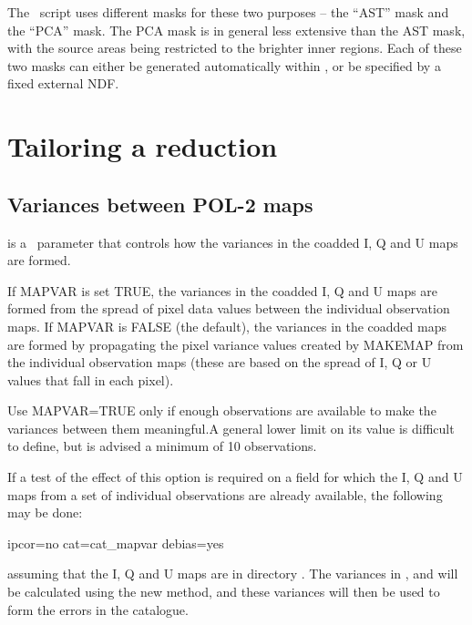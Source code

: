 The \poltwomap\ script uses different masks for these two purposes -- the
``AST'' mask and the ``PCA'' mask.  The PCA mask is in general less
extensive than the AST mask, with the source areas being restricted to
the brighter inner regions.  Each of these two masks can either be
generated automatically within , or be specified by a fixed
external NDF.



\section{Tailoring a reduction}

\subsection*{Variances between POL-2 maps}

 is a \poltwomap\ parameter that controls how the variances in the
coadded I, Q and U maps are formed.

If MAPVAR is set TRUE, the variances in the coadded I, Q and U maps
are formed from the spread of pixel data values between the individual
observation maps. If MAPVAR is FALSE (the default), the variances in
the coadded maps are formed by propagating the pixel variance values
created by MAKEMAP from the individual observation maps (these are
based on the spread of I, Q or U values that fall in each pixel).

Use MAPVAR=TRUE only if enough observations are available to make the
variances between them meaningful.A general lower limit on its value
is difficult to define, but is advised a minimum of 10 observations.


If a test of the effect of this option is required on a field for which
the I, Q and U maps from a set of individual observations are already
available, the following may be done:

\begin{terminalv}
                   ipcor=no cat=cat_mapvar debias=yes
\end{terminalv}

assuming that the I, Q and U maps are in directory . The
variances in ,  and
 will be calculated using the new method, and
these variances will then be used to form the errors in the
 catalogue.



